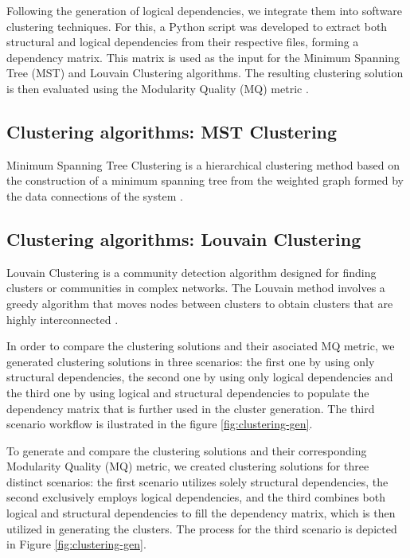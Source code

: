 \documentclass[conference]{IEEEtran}
\begin{document}
Following the generation of logical dependencies, we integrate them into software clustering techniques. For this, a Python script was developed to extract both structural and logical dependencies from their respective files, forming a dependency matrix. This matrix is used as the input for the Minimum Spanning Tree (MST) and Louvain Clustering algorithms. The resulting clustering solution is then evaluated using the Modularity Quality (MQ) metric \cite{mqmetric}.

\subsection{Clustering algorithms: MST Clustering}
Minimum Spanning Tree Clustering is a hierarchical clustering method based on the construction of a minimum spanning tree from the weighted graph formed by the data connections of the system \cite{mst_clustering}.


\subsection{Clustering algorithms: Louvain Clustering}
Louvain Clustering is a community detection algorithm designed for finding clusters or communities in complex networks. The Louvain method involves a greedy algorithm that moves nodes between clusters to obtain clusters that are highly interconnected \cite{louvain_clustering}.

In order to compare the clustering solutions and their asociated MQ metric, we generated clustering solutions in three scenarios: the first one by using only structural dependencies, the second one by using only logical dependencies and the third one by using logical and structural dependencies to populate the dependency matrix that is further used in the cluster generation. The third scenario workflow is ilustrated in the figure \ref{fig:clustering-gen}.

To generate and compare the clustering solutions and their corresponding Modularity Quality (MQ) metric, we created clustering solutions for three distinct scenarios: the first scenario utilizes solely structural dependencies, the second exclusively employs logical dependencies, and the third combines both logical and structural dependencies to fill the dependency matrix, which is then utilized in generating the clusters. The process for the third scenario is depicted in Figure \ref{fig:clustering-gen}.
\end{document}
